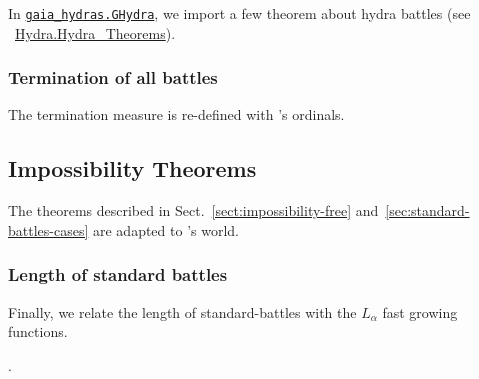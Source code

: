 In \href{../theories/html/gaia_hydras.GHydra.html}%
{\texttt{gaia\_hydras.GHydra}}, we import a few theorem about hydra battles (see
~\href{../theories/html/theories/html/hydras.Hydra.Hydra_Theorems.html}{Hydra.Hydra\_Theorems}).

\subsubsection{Termination of all battles}

The termination measure is re-defined with \gaia's ordinals.



\subsection{Impossibility Theorems}
\label{sect:impossibility-gaia-version}
The theorems described in Sect.~\vref{sect:impossibility-free}
and~\vref{sec:standard-battles-cases} are adapted to \gaia's world.







\subsubsection{Length of standard battles}
  
Finally, we relate the length of standard-battles with the $L_\alpha$ fast growing functions.

.




  
